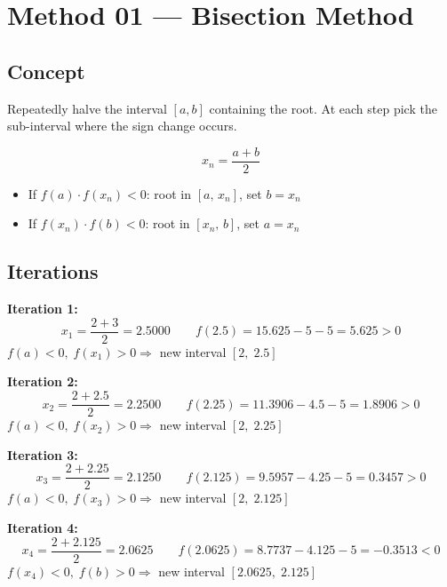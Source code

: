 \documentclass[12pt]{article}
\begin{document}
\section{Method 01 --- Bisection Method}

\subsection*{Concept}
\begin{conceptbox}
Repeatedly halve the interval $[a,b]$ containing the root. At each step pick the sub-interval where the sign change occurs.
\end{conceptbox}

\vspace{8pt}

\begin{formulabox}
\[
  x_n = \frac{a + b}{2}
\]
\vspace{-4pt}
\begin{itemize}[noitemsep, topsep=4pt]
  \item If $f(a)\cdot f(x_n) < 0$\;: root in $[a,\,x_n]$, set $b = x_n$
  \item If $f(x_n)\cdot f(b) < 0$\;: root in $[x_n,\,b]$, set $a = x_n$
\end{itemize}
\end{formulabox}

\vspace{6pt}
\subsection*{Iterations}

\medskip
\noindent\textbf{Iteration 1:}
\[
  x_1 = \frac{2+3}{2} = 2.5000 \qquad f(2.5) = 15.625-5-5 = 5.625>0
\]
$f(a)<0,\;f(x_1)>0 \Rightarrow$ new interval $[2,\;2.5]$

\medskip
\noindent\textbf{Iteration 2:}
\[
  x_2 = \frac{2+2.5}{2} = 2.2500 \qquad f(2.25) = 11.3906-4.5-5 = 1.8906>0
\]
$f(a)<0,\;f(x_2)>0 \Rightarrow$ new interval $[2,\;2.25]$

\medskip
\noindent\textbf{Iteration 3:}
\[
  x_3 = \frac{2+2.25}{2} = 2.1250
  \qquad
  f(2.125) = 9.5957-4.25-5 = 0.3457>0
\]
$f(a)<0,\;f(x_3)>0 \Rightarrow$ new interval $[2,\;2.125]$

\medskip
\noindent\textbf{Iteration 4:}
\[
  x_4 = \frac{2+2.125}{2} = 2.0625
  \qquad
  f(2.0625) = 8.7737-4.125-5 = -0.3513<0
\]
$f(x_4)<0,\;f(b)>0 \Rightarrow$ new interval $[2.0625,\;2.125]$
\end{document}
